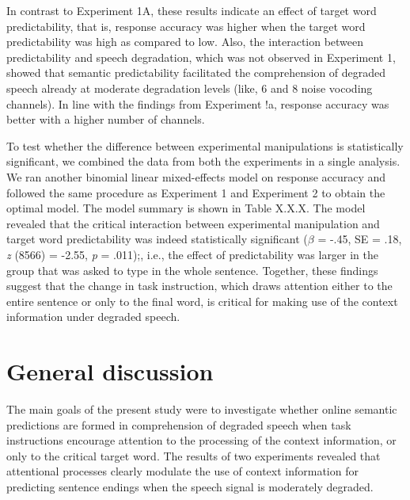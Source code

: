 \documentclass[a4paper, nobind]{templates/ociamthesis}
\begin{document}
In contrast to Experiment 1A, these results indicate an effect of target word predictability, that is, response accuracy was higher when the target word predictability was high as compared to low.
Also, the interaction between predictability and speech degradation, which was not observed in Experiment 1, showed that semantic predictability facilitated the comprehension of degraded speech already at moderate degradation levels (like, 6 and 8 noise vocoding channels).
In line with the findings from Experiment !a, response accuracy was better with a higher number of channels.

To test whether the difference between experimental manipulations is statistically significant, we combined the data from both the experiments in a single analysis.
We ran another binomial linear mixed-effects model on response accuracy and followed the same procedure as Experiment 1 and Experiment 2 to obtain the optimal model.
The model summary is shown in Table X.X.X.
The model revealed that the critical interaction between experimental manipulation and target word predictability was indeed statistically significant (\(\beta\) = -.45, SE = .18, \emph{z} (8566) = -2.55, \emph{p} = .011);, i.e., the effect of predictability was larger in the group that was asked to type in the whole sentence.
Together, these findings suggest that the change in task instruction, which draws attention either to the entire sentence or only to the final word, is critical for making use of the context information under degraded speech.

\hypertarget{general-discussion}{%
\section{General discussion}\label{general-discussion}}

The main goals of the present study were to investigate whether online semantic predictions are formed in comprehension of degraded speech when task instructions encourage attention to the processing of the context information, or only to the critical target word.
The results of two experiments revealed that attentional processes clearly modulate the use of context information for predicting sentence endings when the speech signal is moderately degraded.
\end{document}
